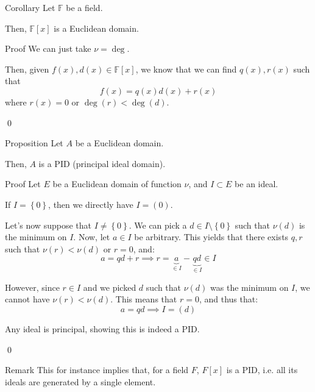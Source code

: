 \documentclass[a4paper]{article}
\begin{document}
\begin{parag}{Corollary}
    Let $\mathbb{F}$ be a field.

    Then, $\mathbb{F}\left[x\right]$ is a Euclidean domain.

    \begin{subparag}{Proof}
        We can just take $\nu = \deg$. 

        Then, given $f\left(x\right), d\left(x\right) \in \mathbb{F}\left[x\right]$, we know that we can find $q\left(x\right), r\left(x\right)$ such that
        \[f\left(x\right) = q\left(x\right)d\left(x\right) + r\left(x\right)\]
        where $r\left(x\right) = 0$ or $\deg\left(r\right) < \deg\left(d\right)$.

        \qed
    \end{subparag}
\end{parag}

\begin{parag}{Proposition}
    Let $A$ be a Euclidean domain.

    Then, $A$ is a PID (principal ideal domain).

    \begin{subparag}{Proof}
        Let $E$ be a Euclidean domain of function $\nu$, and $I \subset E$ be an ideal.

        If $I = \left\{0\right\}$, then we directly have $I = \left(0\right)$.

        Let's now suppose that $I \neq \left\{0\right\}$. We can pick a $d \in I \setminus \left\{0\right\}$ such that $\nu\left(d\right)$ is the minimum on $I$. Now, let $a \in I$ be arbitrary. This yields that there exists $q, r$ such that $\nu\left(r\right) < \nu\left(d\right)$ or $r = 0$, and: 
        \[a = qd + r \implies r = \underbrace{a}_{\in I} - \underbrace{qd}_{\in I} \in I\]

        However, since $r \in I$ and we picked $d$ such that $\nu\left(d\right)$ was the minimum on $I$, we cannot have $\nu\left(r\right) <\nu\left(d\right)$. This means that $r = 0$, and thus that: 
        \[a = qd \implies I = \left(d\right)\]
        
        Any ideal is principal, showing this is indeed a PID.
        
        \qed
    \end{subparag}

    \begin{subparag}{Remark}
        This for instance implies that, for a field $F$, $F\left[x\right]$ is a PID, i.e. all its ideals are generated by a single element.
    \end{subparag}
\end{parag}
\end{document}
